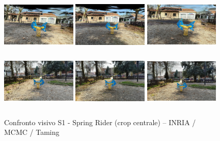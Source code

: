 \begin{figure}[ht]
	\centering
	\includegraphics[width=0.32\textwidth,height=2.8cm,trim={80 40 80 40},clip]{images/benchmarks/spring_rider_inria_balanced_1.jpg}
	\includegraphics[width=0.32\textwidth,height=2.8cm,trim={80 40 80 40},clip]{images/benchmarks/spring_rider_mcmc_balanced_1.jpg}
	\includegraphics[width=0.32\textwidth,height=2.8cm,trim={80 40 80 40},clip]{images/benchmarks/spring_rider_taming_balanced_1.jpg}
	\includegraphics[width=0.32\textwidth,height=2.8cm,trim={80 40 80 40},clip]{images/benchmarks/spring_rider_inria_balanced_2.jpg}
	\includegraphics[width=0.32\textwidth,height=2.8cm,trim={80 40 80 40},clip]{images/benchmarks/spring_rider_mcmc_balanced_2.jpg}
	\includegraphics[width=0.32\textwidth,height=2.8cm,trim={80 40 80 40},clip]{images/benchmarks/spring_rider_taming_balanced_2.jpg}
	\caption{Confronto visivo S1 - Spring Rider (crop centrale) -- INRIA / MCMC / Taming}
	\label{fig:spring_rider_comparison}
\end{figure}



